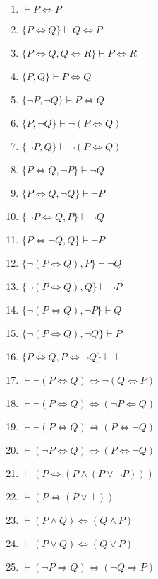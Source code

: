 \begin{enumerate}
    \item $\vdash P \Leftrightarrow P$
    \item $\{P \Leftrightarrow Q\} \vdash Q \Leftrightarrow P$
    \item $\{P \Leftrightarrow Q, Q \Leftrightarrow R\} \vdash P \Leftrightarrow R$
    \item $\{P, Q\}\vdash P \Leftrightarrow Q$
    \item $\{\neg P, \neg Q\} \vdash P \Leftrightarrow Q$
    \item $\{P, \neg Q\} \vdash \neg (P \Leftrightarrow Q)$
    \item $\{\neg P, Q\} \vdash \neg (P \Leftrightarrow Q)$
    \item $\{P \Leftrightarrow Q, \neg P\} \vdash \neg Q$
    \item $\{P \Leftrightarrow Q, \neg Q\} \vdash \neg P$
    \item $\{\neg P \Leftrightarrow Q, P\} \vdash \neg Q$
    \item $\{P \Leftrightarrow \neg Q, Q\} \vdash \neg P$
    \item $\{\neg (P \Leftrightarrow Q), P\} \vdash \neg Q$
    \item $\{\neg (P \Leftrightarrow Q), Q\} \vdash \neg P$
    \item $\{\neg (P \Leftrightarrow Q), \neg P\} \vdash Q$
    \item $\{\neg (P \Leftrightarrow Q), \neg Q\} \vdash P$
    \item $\{P \Leftrightarrow Q, P \Leftrightarrow \neg Q\} \vdash \bot$
    \item $\vdash \neg (P \Leftrightarrow Q) \Leftrightarrow \neg (Q \Leftrightarrow P)$
    \item $\vdash \neg (P \Leftrightarrow Q) \Leftrightarrow (\neg P \Leftrightarrow Q)$
    \item $\vdash \neg (P \Leftrightarrow Q) \Leftrightarrow (P \Leftrightarrow \neg Q)$
    \item $\vdash (\neg P \Leftrightarrow Q) \Leftrightarrow (P \Leftrightarrow \neg Q)$
    \item $\vdash (P \Leftrightarrow (P \land (P \lor \neg P) ))$
    \item $\vdash (P \Leftrightarrow (P \lor \bot ))$
    \item $\vdash (P \land Q) \Leftrightarrow (Q \land P)$
    \item $\vdash (P \lor  Q) \Leftrightarrow (Q \lor  P)$
    \item $\vdash (\neg P\Rightarrow Q) \Leftrightarrow (\neg Q\Rightarrow P)$

\end{enumerate}
